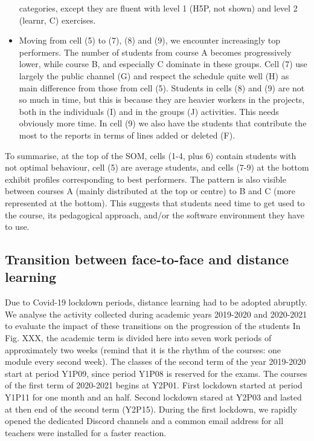 \documentclass{aims}
\theoremstyle{definition}
\begin{document}
\begin{itemize}
  categories, except they are fluent with level 1 (H5P, not shown) and
  level 2 (learnr, C) exercises.
\item
  Moving from cell (5) to (7), (8) and (9), we encounter increasingly
  top performers. The number of students from course A becomes
  progressively lower, while course B, and especially C dominate in
  these groups. Cell (7) use largely the public channel (G) and respect
  the schedule quite well (H) as main difference from those from cell
  (5). Students in cells (8) and (9) are not so much in time, but this
  is because they are heavier workers in the projects, both in the
  individuals (I) and in the groups (J) activities. This needs obviously
  more time. In cell (9) we also have the students that contribute the
  most to the reports in terms of lines added or deleted (F).
\end{itemize}

To summarise, at the top of the SOM, cells (1-4, plus 6) contain
students with not optimal behaviour, cell (5) are average students, and
cells (7-9) at the bottom exhibit profiles corresponding to best
performers. The pattern is also visible between courses A (mainly
distributed at the top or centre) to B and C (more represented at the
bottom). This suggests that students need time to get used to the
course, its pedagogical approach, and/or the software environment they
have to use.

\hypertarget{transition-between-face-to-face-and-distance-learning}{%
\subsection{Transition between face-to-face and distance
learning}\label{transition-between-face-to-face-and-distance-learning}}

Due to Covid-19 lockdown periods, distance learning had to be adopted
abruptly. We analyse the activity collected during academic years
2019-2020 and 2020-2021 to evaluate the impact of these transitions on
the progression of the students In Fig. XXX, the academic term is
divided here into seven work periods of approximately two weeks (remind
that it is the rhythm of the courses: one module every second week). The
classes of the second term of the year 2019-2020 start at period Y1P09,
since period Y1P08 is reserved for the exams. The courses of the first
term of 2020-2021 begins at Y2P01. First lockdown started at period
Y1P11 for one month and an half. Second lockdown stared at Y2P03 and
lasted at then end of the second term (Y2P15). During the first
lockdown, we rapidly opened the dedicated Discord channels and a common
email address for all teachers were installed for a faster reaction.
\end{document}
